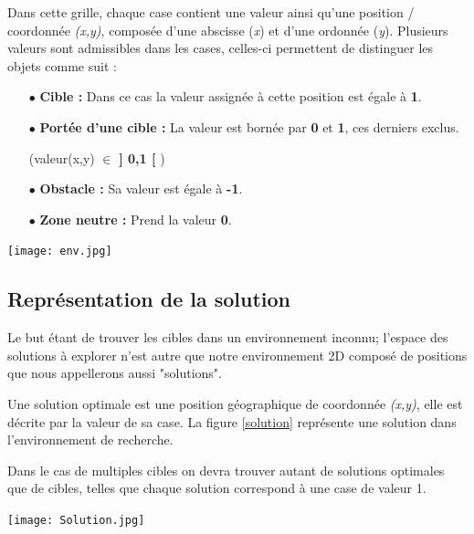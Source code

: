 Dans cette grille, chaque case contient une valeur ainsi qu'une position / coordonnée  \textit{(x,y)}, composée d'une abscisse (\textit{x}) et d'une  ordonnée (\textit{y}). Plusieurs valeurs sont admissibles dans les cases, celles-ci permettent de distinguer les objets comme suit : 
\begin{itemize}
	
	\item[$\bullet$] \textbf{Cible :} Dans ce cas la valeur assignée à cette position est égale à \textbf{1}.
	\item[$\bullet$] \textbf{Portée d'une cible :} La valeur est bornée par \textbf{0} et \textbf{1}, ces derniers exclus.
	
	(valeur(x,y) $\in$ \textbf{] 0,1 [} )
	
	\item[$\bullet$] \textbf{Obstacle :} Sa valeur est égale à \textbf{-1}.
	\item[$\bullet$] \textbf{Zone neutre :} Prend la valeur \textbf{0}.\\
\end{itemize}

\begin{center}	  
	\texttt{[image: env.jpg]}%
	\vspace{-0.1 cm}
	\label{env}%
\end{center}








\subsection{Représentation de la solution}
\label{sol}
Le but étant de trouver les cibles dans un environnement inconnu; l'espace des solutions à explorer n'est autre que notre environnement 2D composé de positions que nous appellerons aussi "solutions". 

Une solution optimale est une position géographique de coordonnée \textit{(x,y)}, elle est décrite par la valeur de sa case. La figure \ref{solution} représente une solution dans l'environnement de recherche. 

Dans le cas de multiples cibles on devra trouver autant de solutions optimales que de cibles, telles que chaque solution correspond à une case de valeur 1.
\begin{center}	  
	\texttt{[image: Solution.jpg]}%
	\vspace{-0.1 cm}
	\label{solution}%
\end{center}

